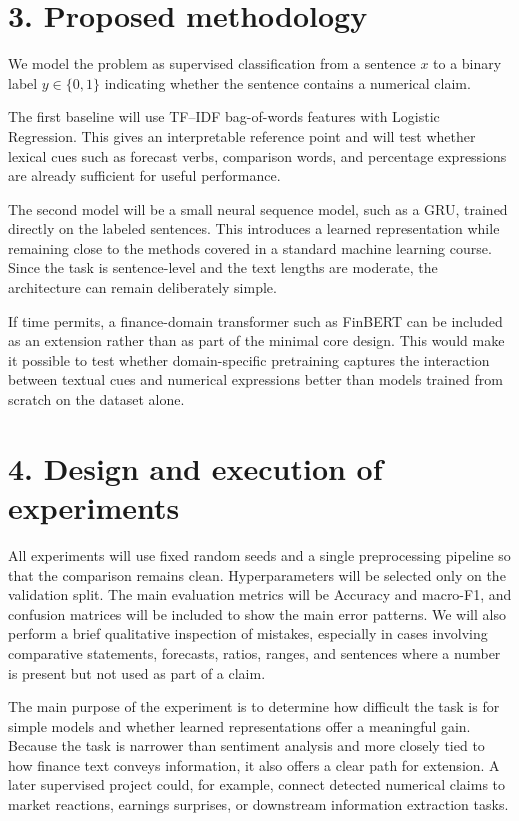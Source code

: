 \documentclass[11pt]{article}
\begin{document}
\section*{3. Proposed methodology}
We model the problem as supervised classification from a sentence $x$ to a binary label $y \in \{0,1\}$ indicating whether the sentence contains a numerical claim.

The first baseline will use TF--IDF bag-of-words features with Logistic Regression. This gives an interpretable reference point and will test whether lexical cues such as forecast verbs, comparison words, and percentage expressions are already sufficient for useful performance.

The second model will be a small neural sequence model, such as a GRU, trained directly on the labeled sentences. This introduces a learned representation while remaining close to the methods covered in a standard machine learning course. Since the task is sentence-level and the text lengths are moderate, the architecture can remain deliberately simple.

If time permits, a finance-domain transformer such as FinBERT can be included as an extension rather than as part of the minimal core design. This would make it possible to test whether domain-specific pretraining captures the interaction between textual cues and numerical expressions better than models trained from scratch on the dataset alone.

\section*{4. Design and execution of experiments}
All experiments will use fixed random seeds and a single preprocessing pipeline so that the comparison remains clean. Hyperparameters will be selected only on the validation split. The main evaluation metrics will be Accuracy and macro-F1, and confusion matrices will be included to show the main error patterns. We will also perform a brief qualitative inspection of mistakes, especially in cases involving comparative statements, forecasts, ratios, ranges, and sentences where a number is present but not used as part of a claim.

The main purpose of the experiment is to determine how difficult the task is for simple models and whether learned representations offer a meaningful gain. Because the task is narrower than sentiment analysis and more closely tied to how finance text conveys information, it also offers a clear path for extension. A later supervised project could, for example, connect detected numerical claims to market reactions, earnings surprises, or downstream information extraction tasks.
\end{document}

